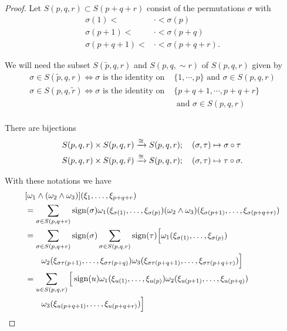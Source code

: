 \begin{proof}
  Let $S(p, q, r)\subset S(p+q+r)$ consist of the permutations $\sigma$ with
  \begin{align*}
    \sigma(1) <     & \cdot < \sigma(p)      \\
    \sigma(p+1) <   & \cdot < \sigma(p+q)    \\
    \sigma(p+q+1) < & \cdot < \sigma(p+q+r).
  \end{align*}

  We will need the subset $S(\tilde{p}, q, r)$ and $S(p, q, \sim{r})$ of $S(p, q, r)$ given by
  \begin{align*}
  \sigma \in S(\tilde{p}, q, r) \Longleftrightarrow \sigma \text{ is the identity on }  & \{1, \cdots, p\} \text{ and } \sigma\in S(p, q, r) \\
  \sigma \in S(p, q, \tilde{r}) \Longleftrightarrow \sigma \text{ is the identity on }  & \{p+q+1, \cdots, p+q+r\}                           \\
                                                                                        & \text{ and } \sigma\in S(p, q, r)                  \\
  \end{align*}

  There are bijections
  \begin{align*}
    S(p, q, r) \times S(p, q, r)         & \xrightarrow[]{\cong} S(p, q, r); \quad (\sigma, \tau)\mapsto\sigma\circ\tau   \\
    S(p, q, r) \times S(p, q, \tilde{r}) & \xrightarrow[]{\cong} S(p, q, r); \quad (\sigma, \tau)\mapsto\tau\circ\sigma.
  \end{align*}

  With these notations we have
  \begin{align*}
    & [\omega_1\wedge(\omega_2\wedge\omega_3)](\xi_1,\ldots,\xi_{p+q+r})                                                                              \\
    & = \sum_{\sigma\in S(p,q+r)}\operatorname{sign}(\sigma)\omega_1(\xi_{\sigma(1)},\ldots,\xi_{\sigma(p)})
    (\omega_2\wedge\omega_3)(\xi_{\sigma(p+1)},\ldots,\xi_{\sigma(p+q+r)})                                                                             \\
    & = \sum_{\sigma\in S(p,q+r)}\operatorname{sign}(\sigma)\sum_{\sigma\in S(p,q,r)}\operatorname{sign}(\tau)\Big[\omega_1(\xi_{\sigma(1)},\ldots,\xi_{\sigma(p)})               \\
    & \hspace*{2em} \omega_2(\xi_{\sigma\tau(p+1)},\ldots,\xi_{\sigma\tau(p+q)})\omega_3(\xi_{\sigma\tau(p+q+1)},\ldots,\xi_{\sigma\tau(p+q+r)})\Big] \\
    & = \sum_{u\in S(p,q,r)}\Big[\operatorname{sign}(u)\omega_1(\xi_{u(1)},\ldots,\xi_{u(p)})\omega_2(\xi_{u(p+1)},\ldots,\xi_{u(p+q)})                             \\
    & \hspace*{2em} \omega_3(\xi_{u(p+q+1)},\ldots,\xi_{u(p+q+r)})\Big]
  \end{align*}


\end{proof}
